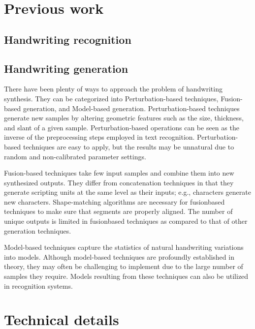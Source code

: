 \documentclass{article} %
\begin{document}
\section{Previous work}
\subsection{Handwriting recognition} %
\subsection{Handwriting generation} %
There have been plenty of ways to approach the problem of handwriting synthesis. They can be categorized into Perturbation-based techniques, Fusion-based generation, and Model-based generation. 
Perturbation-based techniques generate new samples by
altering geometric features such as the size, thickness, and
slant of a given sample. Perturbation-based operations can
be seen as the inverse of the preprocessing steps employed
in text recognition. Perturbation-based techniques are easy
to apply, but the results may be unnatural due to random and
non-calibrated parameter settings. 

Fusion-based techniques take few input samples and combine
them into new synthesized outputs. They differ from concatenation
techniques in that they generate scripting units at the
same level as their inputs; e.g., characters generate new characters.
Shape-matching algorithms are necessary for fusionbased
techniques to make sure that segments are properly
aligned. The number of unique outputs is limited in fusionbased
techniques as compared to that of other generation
techniques.

Model-based techniques capture the statistics of natural
handwriting variations into models. Although model-based
techniques are profoundly established in theory, they may
often be challenging to implement due to the large number
of samples they require. Models resulting from
these techniques can also be utilized in recognition systems. 

\section{Technical details}
\end{document}
